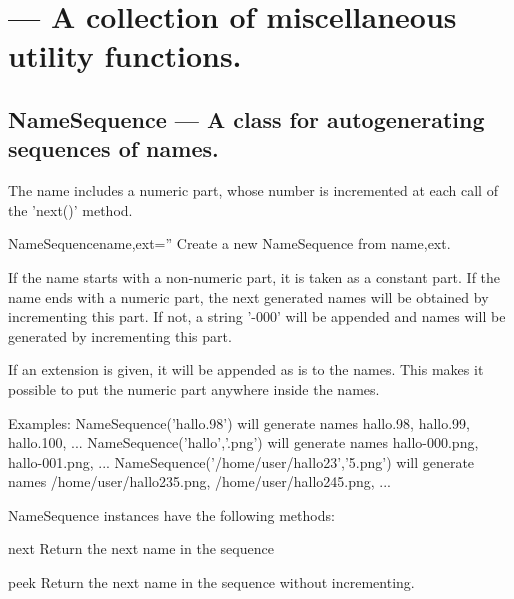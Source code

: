 

\section{ --- A collection of miscellaneous utility functions.}
\label{sec:utils}




\subsection{NameSequence --- A class for autogenerating sequences of names.}
    The name includes a numeric part, whose number is incremented
    at each call of the 'next()' method.
    

\begin{classdesc}{NameSequence}{name,ext=''}
Create a new NameSequence from name,ext.

        If the name starts with a non-numeric part, it is taken as a constant
        part.
        If the name ends with a numeric part, the next generated names will
        be obtained by incrementing this part.
        If not, a string '-000' will be appended and names will be generated
        by incrementing this part.

        If an extension is given, it will be appended as is to the names.
        This makes it possible to put the numeric part anywhere inside the
        names.

        Examples:
            NameSequence('hallo.98') will generate names
                hallo.98, hallo.99, hallo.100, ...
            NameSequence('hallo','.png') will generate names
                hallo-000.png, hallo-001.png, ...
            NameSequence('/home/user/hallo23','5.png') will generate names
                /home/user/hallo235.png, /home/user/hallo245.png, ...
        
\end{classdesc}

NameSequence instances have the following methods:

\begin{funcdesc}{next}{}
Return the next name in the sequence
\end{funcdesc}

\begin{funcdesc}{peek}{}
Return the next name in the sequence without incrementing.
\end{funcdesc}

